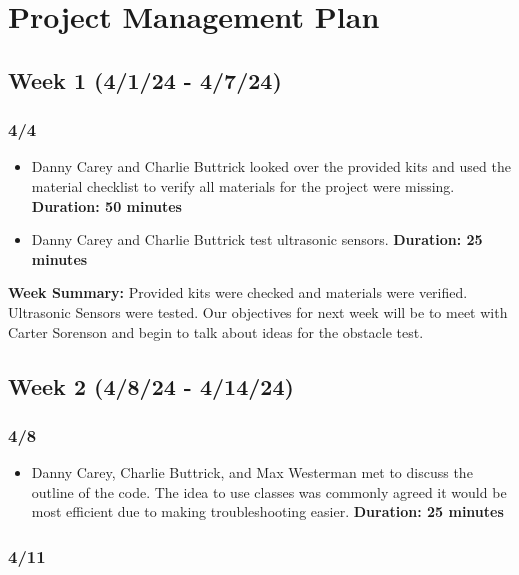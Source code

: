 \documentclass[12pt]{report}
\begin{document}
\SectionuseSubSectionSizing
\SubSectionuseSubSubSectionSizing
\setlength{\parindent}{0pt} %

\chapter{Project Management Plan}\label{ch:project-management-plan}

\section{Week 1 (4/1/24 - 4/7/24)}
\subsection*{4/4}

\begin{itemize}
    \item Danny Carey and Charlie Buttrick looked over the provided kits and used the material checklist to verify all materials for the project were missing. \textbf{Duration: 50 minutes}
    \item Danny Carey and Charlie Buttrick test ultrasonic sensors. \textbf{Duration: 25 minutes}
\end{itemize}

\textbf{Week Summary:} Provided kits were checked and materials were verified. Ultrasonic Sensors were tested. Our objectives for next week will be to meet with Carter Sorenson and begin to talk about ideas for the obstacle test.

\section{Week 2 (4/8/24 - 4/14/24)}
\subsection*{4/8}

\begin{itemize}
    \item Danny Carey, Charlie Buttrick, and Max Westerman met to discuss the outline of the code. The idea to use classes was commonly agreed it would be most efficient due to making troubleshooting easier. \textbf{Duration: 25 minutes}
\end{itemize}

\subsection*{4/11}
\end{document}
